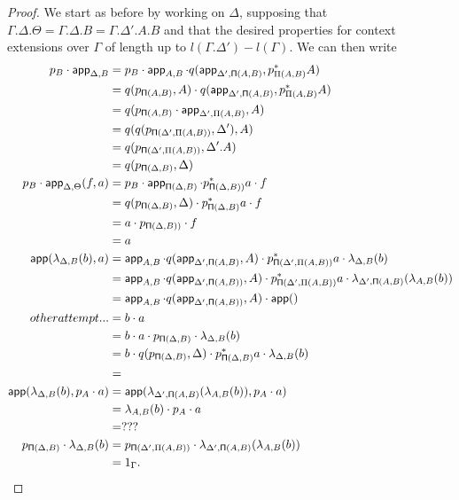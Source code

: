 \begin{proof}
  We start as before by working on $\Delta$, supposing that
  $\Gamma.\Delta.\Theta=\Gamma.\Delta.B=\Gamma.\Delta'.A.B$ and that
  the desired properties for context extensions over $\Gamma$ of length
  up to $l(\Gamma.\Delta')-l(\Gamma)$.
  We can then write
  \begin{align*}
    p_B\cdot\operatorname{\mathsf{app}}_{\Delta,B}
    &=p_B\cdot
    \operatorname{\mathsf{app}}_{A,B}\cdot
    q(\operatorname{\mathsf{app}}_{\Delta',\operatorname{\mathsf{\Pi}}(A,B)},p^*_{\Pi(A,B)}A) \\
    &=q(p_{\operatorname{\mathsf{\Pi}}(A,B)},A)\cdot
    q(\operatorname{\mathsf{app}}_{\Delta',\operatorname{\mathsf{\Pi}}(A,B)},p^*_{\Pi(A,B)}A) \\
    &=q(p_{\operatorname{\mathsf{\Pi}}(A,B)}\cdot\operatorname{\mathsf{app}}_{\Delta',\Pi(A,B)},A) \\
    &=q(q(p_{\operatorname{\mathsf{\Pi}}(\Delta',\Pi(A,B))},\Delta'),A) \\
    &=q(p_{\operatorname{\mathsf{\Pi}}(\Delta',\Pi(A,B))},\Delta'.A) \\
    &=q(p_{\operatorname{\mathsf{\Pi}}(\Delta,B)},\Delta) \\
    p_B\cdot\operatorname{\mathsf{app}}_{\Delta,\Theta}(f,a)
    &=p_B\cdot
    \operatorname{\mathsf{app}}_{\operatorname{\mathsf{\Pi}}(\Delta,B)}\cdot
    p^*_{\operatorname{\mathsf{\Pi}}(\Delta,B))}a\cdot
    f \\
    &=q(p_{\operatorname{\mathsf{\Pi}}(\Delta,B)},\Delta)\cdot
    p^*_{\operatorname{\mathsf{\Pi}}(\Delta,B)}a\cdot
    f \\
    &=a\cdot
    p_{\operatorname{\mathsf{\Pi}}(\Delta,B))}\cdot
    f \\
    &=a \\
    \operatorname{\mathsf{app}}(\lambda_{\Delta,B}(b),a)
    &=\operatorname{\mathsf{app}}_{A,B}\cdot
    q(\operatorname{\mathsf{app}}_{\Delta',\operatorname{\mathsf{\Pi}}(A,B)},A)\cdot
    p^*_{\operatorname{\mathsf{\Pi}}(\Delta',\Pi(A,B))}a\cdot
    \lambda_{\Delta,B}(b) \\
    &=\operatorname{\mathsf{app}}_{A,B}\cdot
    q(\operatorname{\mathsf{app}}_{\Delta',\operatorname{\mathsf{\Pi}}(A,B))},A)\cdot
    p^*_{\operatorname{\mathsf{\Pi}}(\Delta',\Pi(A,B))}a\cdot
    \lambda_{\Delta',\operatorname{\mathsf{\Pi}}(A,B)}(\lambda_{A,B}(b)) \\
    &=\operatorname{\mathsf{app}}_{A,B}\cdot
    q(\operatorname{\mathsf{app}}_{\Delta',\operatorname{\mathsf{\Pi}}(A,B))},A)\cdot
    \operatorname{\mathsf{app}}() \\
    other attempt...
    &=b\cdot a \\
    &=b\cdot
    a\cdot
    p_{\operatorname{\mathsf{\Pi}}(\Delta,B)}\cdot
    \lambda_{\Delta,B}(b) \\
    &=b\cdot
    q(p_{\operatorname{\mathsf{\Pi}}(\Delta,B)},\Delta)\cdot
    p^*_{\operatorname{\mathsf{\Pi}}(\Delta,B)}a\cdot
    \lambda_{\Delta,B}(b) \\
    &= \\
    \operatorname{\mathsf{app}}(\lambda_{\Delta,B}(b),p_A\cdot a)
    &=\operatorname{\mathsf{app}}(\lambda_{\Delta',\operatorname{\mathsf{\Pi}}(A,B)}(\lambda_{A,B}(b)),p_A\cdot a) \\
    &=\lambda_{A,B}(b)\cdot p_A\cdot a \\
    &= ??? \\
    p_{\operatorname{\mathsf{\Pi}}(\Delta,B)}\cdot\lambda_{\Delta,B}(b)
    &=p_{\operatorname{\mathsf{\Pi}}(\Delta',\Pi(A,B))}\cdot
    \lambda_{\Delta',\operatorname{\mathsf{\Pi}}(A,B)}(\lambda_{A,B}(b)) \\
    &=1_\Gamma.
  \end{align*}


\end{proof}
